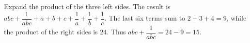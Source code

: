 Expand the product of the three left sides. The result is $abc+\dfrac{1}{abc}+a+b+c+\dfrac{1}{a}+\dfrac{1}{b}+\dfrac{1}{c}$. The last six terms sum to $2+3+4=9$, while the product of the right sides is $24$. Thus $abc+\dfrac{1}{abc}=24-9=\boxed{15}$.
